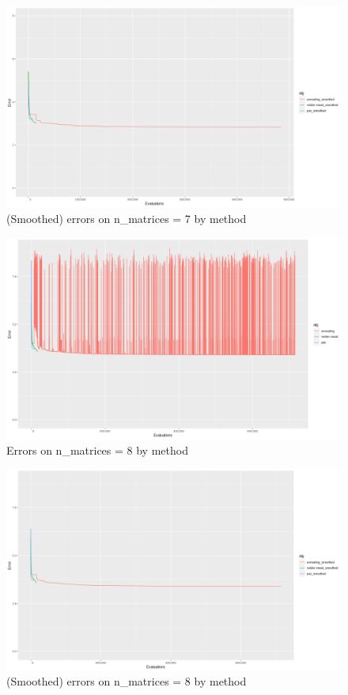 \begin{figure}[!htb]
\centering
\includegraphics[width=\textwidth]{figures/n_7_smoothed}
\decoRule
\caption[n=7 (smoothed)]{(Smoothed) errors on n\_matrices = 7 by method}
\label{fig:n_7_smoothed}
\end{figure}

\begin{figure}[!htb]
\centering
\includegraphics[width=\textwidth]{figures/n_8}
\decoRule
\caption[n=8]{Errors on n\_matrices = 8 by method}
\label{fig:n_8}
\end{figure}

\begin{figure}[!htb]
\centering
\includegraphics[width=\textwidth]{figures/n_8_smoothed}
\decoRule
\caption[n=8 (smoothed)]{(Smoothed) errors on n\_matrices = 8 by method}
\label{fig:n_8_smoothed}
\end{figure}

